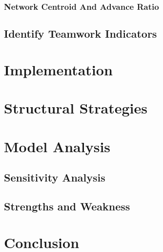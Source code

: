 \documentclass{mcmthesis}
\begin{document}
\subsubsection{Network Centroid And Advance Ratio}
\subsection{Identify Teamwork Indicators}
\section{Implementation}
\section{Structural Strategies}
\section{Model Analysis}
\subsection{Sensitivity Analysis}
\subsection{Strengths and Weakness}
\section{Conclusion}


\newpage

\begin{appendices}


\end{appendices}
\end{document}
